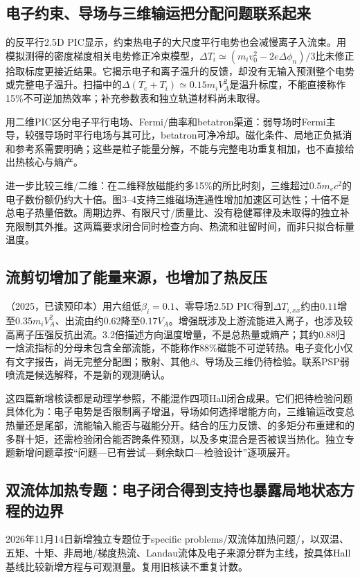 \subsection{电子约束、导场与三维输运把分配问题联系起来}
\citet{Haggerty2015Partition}的反平行2.5D PIC显示，约束热电子的大尺度平行电势也会减慢离子入流束。用模拟测得的密度梯度相关电势修正冷束模型，$\Delta T_i\simeq(m_iv_0^2-2e\Delta\phi_n)/3$比未修正拾取标度更接近结果。它揭示电子和离子温升的反馈，却没有无输入预测整个电势或完整电子温升。扫描中的$\Delta(T_e+T_i)\simeq0.15m_iV_A^2$是温升标度，不能直接称作15\%不可逆加热效率；补充参数表和独立轨道材料尚未取得。

\citet{Dahlin2014Mechanisms}用二维PIC区分电子平行电场、Fermi/曲率和betatron渠道：弱导场时Fermi主导，较强导场时平行电场与其可比，betatron可净冷却。磁化条件、局地正负抵消和参考系需要明确；这些是粒子能量分解，不能与完整电功重复相加，也不直接给出热核心与熵产。

\citet{Dahlin2015ThreeD}进一步比较三维/二维：在二维释放磁能约多15\%的所比时刻，三维超过$0.5m_ec^2$的电子数份额仍约大十倍。图3--4支持三维磁场连通性增加加速区可达性；十倍不是总电子热量倍数。周期边界、有限尺寸/质量比、没有稳健幂律及未取得的独立补充限制其外推。这两篇要求闭合同时检查方向、热流和驻留时间，而非只拟合标量温度。

\subsection{流剪切增加了能量来源，也增加了热反压}
\citet{F627}（2025，已读预印本）用六组低$\beta_i=0.1$、零导场2.5D PIC得到$\Delta T_{i,xx}$约由$0.11$增至$0.35m_iV_A^2$、出流由约$0.62$降至$0.17V_A$。增强既涉及上游流能进入离子，也涉及较高离子压强反抗出流。3.2倍描述方向温度增量，不是总热量或熵产；其约0.88归一焓流指标的分母未包含全部流能，不能称作88\%磁能不可逆转热。电子变化小仅有文字报告，尚无完整分配图；散射、其他$\beta$、导场及三维仍待检验。联系PSP弱喷流是候选解释，不是新的观测确认。

这四篇新增核读都是动理学参照，不能混作四项Hall闭合成果。它们把待检验问题具体化为：电子电势是否限制离子增温，导场如何选择增能方向，三维输运改变总热量还是尾部，流能输入能否与磁能分开。结合\citet{F611}的压力反馈、\citet{E553}的多矩分布重建和\citet{F635}的多群十矩，还需检验闭合能否跨条件预测，以及多束混合是否被误当热化。独立专题新增问题章按“问题—已有尝试—剩余缺口—检验设计”逐项展开。

\subsection{双流体加热专题：电子闭合得到支持也暴露局地状态方程的边界}
2026年11月14日新增独立专题位于\textsf{specific problems/双流体加热问题/}，以双温、五矩、十矩、非局地/梯度热流、Landau流体及电子来源分群为主线，按具体Hall基线比较新增方程与可观测量。复用旧核读不重复计数。

